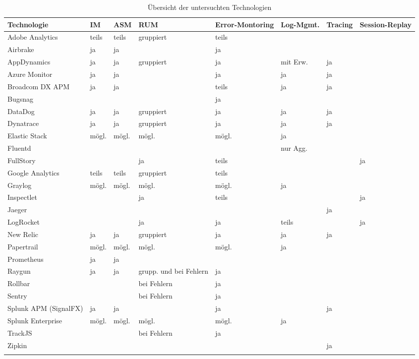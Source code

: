 \begingroup
\centering
\setlength{\LTleft}{-20cm plus -1fill}
\setlength{\LTright}{\LTleft}
\begin{longtable}{|p{4.10cm}|p{0.90cm}|p{0.90cm}|p{1.9cm}|p{1.75cm}|p{1.5cm}|p{1.4cm}|p{1.3cm}|}
\hline
Technologie & IM & ASM & RUM & Error-Montoring & Log-Mgmt. & Tracing & Session-Replay \\
\endhead
\hline
Adobe Analytics & teils & teils & gruppiert & teils &  &  &  \\
\hline
Airbrake & ja & ja &  & ja &  &  &  \\
\hline
AppDynamics & ja & ja & gruppiert & ja & mit Erw. & ja &  \\
\hline
Azure Monitor & ja & ja &  & ja & ja & ja &  \\
\hline
Broadcom DX APM & ja & ja &  & teils & ja & ja &  \\
\hline
Bugsnag &  &  &  & ja &  &  &  \\
\hline
DataDog & ja & ja & gruppiert & ja & ja & ja &  \\
\hline
Dynatrace & ja & ja & gruppiert & ja & ja & ja &  \\
\hline
Elastic Stack & mögl. & mögl. & mögl. & mögl. & ja &  &  \\
\hline
Fluentd &  &  &  &  & nur Agg. &  &  \\
\hline
FullStory &  &  & ja & teils &  &  & ja \\
\hline
Google Analytics & teils & teils & gruppiert & teils &  &  &  \\
\hline
Graylog & mögl. & mögl. & mögl. & mögl. & ja &  &  \\
\hline
Inspectlet &  &  & ja & teils &  &  & ja \\
\hline
Jaeger &  &  &  &  &  & ja &  \\
\hline
LogRocket &  &  & ja & ja & teils &  & ja \\
\hline
New Relic & ja & ja & gruppiert & ja & ja & ja &  \\
\hline
Papertrail & mögl. & mögl. & mögl. & mögl. & ja &  &  \\
\hline
Prometheus & ja & ja &  &  &  &  &  \\
\hline
Raygun & ja & ja & grupp. und bei \mbox{Fehlern} & ja &  &  &  \\
\hline
Rollbar &  &  & bei \mbox{Fehlern} & ja &  &  &  \\
\hline
Sentry &  &  & bei \mbox{Fehlern} & ja &  &  &  \\
\hline
Splunk APM (SignalFX) & ja & ja &  & ja &  & ja &  \\
\hline
Splunk \mbox{Enterprise} & mögl. & mögl. & mögl. & mögl. & ja &  &  \\
\hline
TrackJS &  &  & bei \mbox{Fehlern} & ja &  &  &  \\
\hline
Zipkin &  &  &  &  &  & ja &  \\
\hline
\caption{Übersicht der untersuchten Technologien}
\label{tab:technologie-uebersicht}
\end{longtable}
\endgroup
